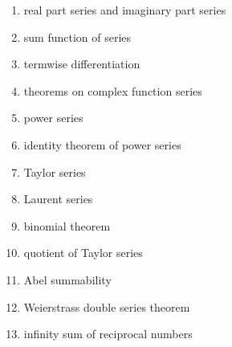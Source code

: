 \documentclass[12pt]{article}
\theoremstyle{definition}
\begin{document}
\begin{multicols}{2}
\begin{enumerate}
\item real part series and imaginary part series
\item sum function of series
\item termwise differentiation
\item theorems on complex function series
\item power series
\item identity theorem of power series
\item Taylor series
\item Laurent series
\item binomial theorem
\item quotient of Taylor series
\item Abel summability
\item Weierstrass double series theorem
\item infinity sum of reciprocal numbers
\end{enumerate}
\end{multicols}

\end{document}

